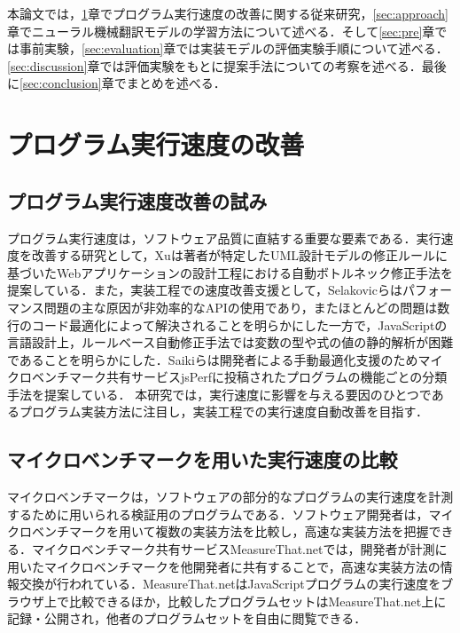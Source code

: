 \documentclass[submit,ses,noauthor]{ipsj}
\begin{document}
本論文では，\ref{sec:back}章でプログラム実行速度の改善に関する従来研究，\ref{sec:approach}章でニューラル機械翻訳モデルの学習方法について述べる．そして\ref{sec:pre}章では事前実験，\ref{sec:evaluation}章では実装モデルの評価実験手順について述べる．\ref{sec:discussion}章では評価実験をもとに提案手法についての考察を述べる．最後に\ref{sec:conclusion}章でまとめを述べる．


\section{プログラム実行速度の改善}\label{sec:back}

\subsection{プログラム実行速度改善の試み}

プログラム実行速度は，ソフトウェア品質に直結する重要な要素である．実行速度を改善する研究として，Xuは著者が特定したUML設計モデルの修正ルールに基づいたWebアプリケーションの設計工程における自動ボトルネック修正手法を提案している\cite{xu_2008}．また，実装工程での速度改善支援として，Selakovicらはパフォーマンス問題の主な原因が非効率的なAPIの使用であり，またほとんどの問題は数行のコード最適化によって解決されることを明らかにした一方で，JavaScriptの言語設計上，ルールベース自動修正手法では変数の型や式の値の静的解析が困難であることを明らかにした\cite{selakovic_2016}．Saikiらは開発者による手動最適化支援のためマイクロベンチマーク共有サービスjsPerfに投稿されたプログラムの機能ごとの分類手法を提案している\cite{saiki_2021}．
本研究では，実行速度に影響を与える要因のひとつであるプログラム実装方法に注目し，実装工程での実行速度自動改善を目指す．

\subsection{マイクロベンチマークを用いた実行速度の比較}

マイクロベンチマークは，ソフトウェアの部分的なプログラムの実行速度を計測するために用いられる検証用のプログラムである．ソフトウェア開発者は，マイクロベンチマークを用いて複数の実装方法を比較し，高速な実装方法を把握できる．マイクロベンチマーク共有サービスMeasureThat.netでは，開発者が計測に用いたマイクロベンチマークを他開発者に共有することで，高速な実装方法の情報交換が行われている．MeasureThat.netはJavaScriptプログラムの実行速度をブラウザ上で比較できるほか，比較したプログラムセットはMeasureThat.net上に記録・公開され，他者のプログラムセットを自由に閲覧できる．
\end{document}
